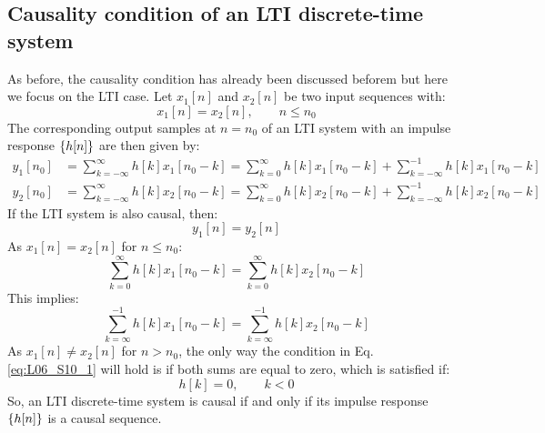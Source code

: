 \documentclass[../../main/main.tex]{subfiles}
\begin{document}
\subsection{Causality condition of an LTI discrete-time system}
As before, the causality condition has already been discussed beforem but here we focus on the LTI case. Let \( x_{1}[n] \) and \( x_{2}[n] \) be two input sequences with:
\begin{equation}
    x_{1}[n]
    =
    x_{2}[n],
    \qquad
    n \le n_{0}
    \label{eq:L06_S08_1}
\end{equation}
The corresponding output samples at \( n = n_{0} \) of an LTI system with an impulse response \( \qty{h[n]} \) are then given by:
\begin{align}
    y_{1}[n_{0}]
    &=
        \sum_{k = -\infty}^{\infty} h[k]x_{1}[n_{0}-k]
        =
        \sum_{k=0}^{\infty} h[k]x_{1}[n_{0}-k] + \sum_{k=-\infty}^{-1} h[k]x_{1}[n_{0}-k]   \\
    y_{2}[n_{0}]
    &=
        \sum_{k = -\infty}^{\infty} h[k]x_{2}[n_{0}-k]
        =
        \sum_{k=0}^{\infty} h[k]x_{2}[n_{0}-k] + \sum_{k=-\infty}^{-1} h[k]x_{2}[n_{0}-k]
\end{align}
If the LTI system is also causal, then:
\begin{equation}
    y_{1}[n]
    =
    y_{2}[n]
    \label{eq:L06_S09_2}
\end{equation}
As \( x_{1}[n] = x_{2}[n] \) for \( n \le n_{0} \):
\begin{equation}
    \sum_{k=0}^{\infty} h[k]x_{1}[n_{0}-k]
    =
    \sum_{k=0}^{\infty} h[k]x_{2}[n_{0}-k]
    \label{eq:L06_S09_3}
\end{equation}
This implies:
\begin{equation}
    \sum_{k=\infty}^{-1} h[k]x_{1}[n_{0}-k]
    =
    \sum_{k=\infty}^{-1} h[k]x_{2}[n_{0}-k]
    \label{eq:L06_S10_1}
\end{equation}
As \( x_{1}[n] \neq x_{2}[n] \) for \( n > n_{0} \), the only way the condition in Eq. \ref{eq:L06_S10_1} will hold is if both sums are equal to zero, which is satisfied if:
\begin{equation}
    h[k]
    =
    0,
    \qquad
    k < 0
    \label{eq:L06_S10_3}
\end{equation}
So, an LTI discrete-time system is causal if and only if its impulse response \( \qty{h[n]} \) is a causal sequence.
\end{document}
